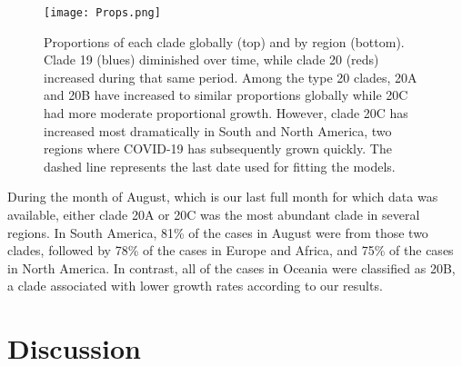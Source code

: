 \documentclass[9pt,twocolumn,twoside,lineno]{pnas-new}
\begin{document}
\begin{figure}%
\centering
\texttt{[image: Props.png]}
\caption{Proportions of each clade globally (top) and by region (bottom). Clade 19 (blues) diminished over time, while clade 20 (reds) increased during that same period. Among the type 20 clades, 20A and 20B have increased to similar proportions globally while 20C had more moderate proportional growth. However, clade 20C has increased most dramatically in South and North America, two regions where COVID-19 has subsequently grown quickly. The dashed line represents the last date used for fitting the models.}
\label{fig:Proportions}
\end{figure}


During the month of August, which is our last full month for which data was available, either clade 20A or 20C was the most abundant clade in several regions. In South America, 81\% of the cases in August were from those two clades, followed by 78\% of the cases in Europe and Africa, and 75\% of the cases in North America. In contrast, all of the cases in Oceania were classified as 20B, a clade associated with lower growth rates according to our results.

\section*{Discussion}
\end{document}
